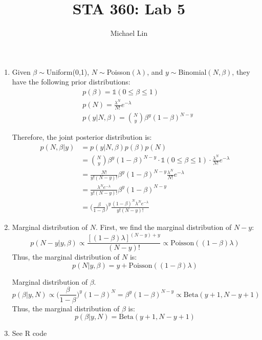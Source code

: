 \documentclass{article}
\title{STA 360: Lab 5}
\author{Michael Lin}
\begin{document}
\maketitle

\begin{enumerate}
\item Given $\beta\sim$Uniform(0,1), $N \sim$Poisson$(\lambda)$, and $y\sim$Binomial$(N,\beta)$, they have the following prior distributions:
\begin{align*}
&p(\beta) = \mathds{1}(0\leq \beta \leq 1) \\
&p(N) = \frac{\lambda^N}{N!}e^{-\lambda} \\
&p(y|N,\beta) = \binom{N}{y} \beta^y(1-\beta)^{N-y}
\end{align*}

Therefore, the joint posterior distribution is:
\begin{align*}
p(N,\beta|y) &= p(y|N,\beta)p(\beta)p(N) \\
&= \binom{N}{y}\beta^y(1-\beta)^{N-y}\cdot \mathds{1}(0\leq \beta \leq 1)\cdot \frac{\lambda^N}{N!}e^{-\lambda} \\
&= \frac{N!}{y!(N-y)!}\beta^y(1-\beta)^{N-y}\frac{\lambda^N}{N!}e^{-\lambda} \\
&= \frac{\lambda^N e^{-\lambda}}{y!(N-y)!}\beta^y(1-\beta)^{N-y} \\
&=\Big(\frac{\beta}{1-\beta}\Big)^y\frac{(1-\beta)^N \lambda^N e^{-\lambda}}{y!(N-y)!}
\end{align*}

\item Marginal distribution of $N$. First, we find the marginal distribution of $N-y$:
$$ p(N-y | y,\beta) \propto \frac{[(1-\beta)\lambda]^{(N-y)+y}}{(N-y)!} \propto \text{Poisson}((1-\beta)\lambda) $$
Thus, the marginal distribution of $N$ is:
$$ p(N | y,\beta) = y + \text{Poisson}((1-\beta)\lambda) $$

Marginal distribution of $\beta$.
$$ p(\beta | y,N) \propto \Big(\frac{\beta}{1-\beta}\Big)^y(1-\beta)^N = \beta^y(1-\beta)^{N-y} \propto \text{Beta}(y+1, N-y+1) $$
Thus, the marginal distribution of $\beta$ is:
$$ p(\beta | y,N)=\text{Beta}(y+1, N-y+1)$$

\item See R code


\end{enumerate}
\end{document}
